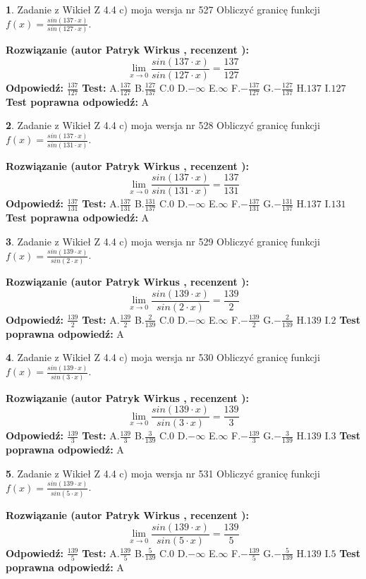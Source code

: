 \documentclass[12pt, a4paper]{article}
\theoremstyle{definition} %
\newtheorem{zad}{}
\newcommand{\zadStart}[1]{\begin{zad}#1\newline}
\newcommand{\zadStop}{\end{zad}}
\newcommand{\rozwStart}[2]{\noindent \textbf{Rozwiązanie (autor #1 , recenzent #2): }\newline}
\newcommand{\rozwStop}{\newline}
\newcommand{\odpStart}{\noindent \textbf{Odpowiedź:}\newline}
\newcommand{\odpStop}{\newline}
\newcommand{\testStart}{\noindent \textbf{Test:}\newline}
\newcommand{\testStop}{\newline}
\newcommand{\kluczStart}{\noindent \textbf{Test poprawna odpowiedź:}\newline}
\newcommand{\kluczStop}{\newline}
\begin{document}
\zadStart{Zadanie z Wikieł Z 4.4 c) moja wersja nr 527}
Obliczyć granicę funkcji $f(x)=\frac{sin(137\cdot x)}{sin(127\cdot x)}$.
\zadStop
\rozwStart{Patryk Wirkus}{}
$$\lim\limits_{x\to 0}\frac{sin(137\cdot x)}{sin(127\cdot x)}=
\frac{137}{127}$$
\rozwStop
\odpStart
$\frac{137}{127}$
\odpStop
\testStart
A.$\frac{137}{127}$
B.$\frac{127}{137}$
C.$0$
D.$-\infty$
E.$\infty$
F.$-\frac{137}{127}$
G.$-\frac{127}{137}$
H.$137$
I.$127$
\testStop
\kluczStart
A
\kluczStop



\zadStart{Zadanie z Wikieł Z 4.4 c) moja wersja nr 528}
Obliczyć granicę funkcji $f(x)=\frac{sin(137\cdot x)}{sin(131\cdot x)}$.
\zadStop
\rozwStart{Patryk Wirkus}{}
$$\lim\limits_{x\to 0}\frac{sin(137\cdot x)}{sin(131\cdot x)}=
\frac{137}{131}$$
\rozwStop
\odpStart
$\frac{137}{131}$
\odpStop
\testStart
A.$\frac{137}{131}$
B.$\frac{131}{137}$
C.$0$
D.$-\infty$
E.$\infty$
F.$-\frac{137}{131}$
G.$-\frac{131}{137}$
H.$137$
I.$131$
\testStop
\kluczStart
A
\kluczStop



\zadStart{Zadanie z Wikieł Z 4.4 c) moja wersja nr 529}
Obliczyć granicę funkcji $f(x)=\frac{sin(139\cdot x)}{sin(2\cdot x)}$.
\zadStop
\rozwStart{Patryk Wirkus}{}
$$\lim\limits_{x\to 0}\frac{sin(139\cdot x)}{sin(2\cdot x)}=
\frac{139}{2}$$
\rozwStop
\odpStart
$\frac{139}{2}$
\odpStop
\testStart
A.$\frac{139}{2}$
B.$\frac{2}{139}$
C.$0$
D.$-\infty$
E.$\infty$
F.$-\frac{139}{2}$
G.$-\frac{2}{139}$
H.$139$
I.$2$
\testStop
\kluczStart
A
\kluczStop



\zadStart{Zadanie z Wikieł Z 4.4 c) moja wersja nr 530}
Obliczyć granicę funkcji $f(x)=\frac{sin(139\cdot x)}{sin(3\cdot x)}$.
\zadStop
\rozwStart{Patryk Wirkus}{}
$$\lim\limits_{x\to 0}\frac{sin(139\cdot x)}{sin(3\cdot x)}=
\frac{139}{3}$$
\rozwStop
\odpStart
$\frac{139}{3}$
\odpStop
\testStart
A.$\frac{139}{3}$
B.$\frac{3}{139}$
C.$0$
D.$-\infty$
E.$\infty$
F.$-\frac{139}{3}$
G.$-\frac{3}{139}$
H.$139$
I.$3$
\testStop
\kluczStart
A
\kluczStop



\zadStart{Zadanie z Wikieł Z 4.4 c) moja wersja nr 531}
Obliczyć granicę funkcji $f(x)=\frac{sin(139\cdot x)}{sin(5\cdot x)}$.
\zadStop
\rozwStart{Patryk Wirkus}{}
$$\lim\limits_{x\to 0}\frac{sin(139\cdot x)}{sin(5\cdot x)}=
\frac{139}{5}$$
\rozwStop
\odpStart
$\frac{139}{5}$
\odpStop
\testStart
A.$\frac{139}{5}$
B.$\frac{5}{139}$
C.$0$
D.$-\infty$
E.$\infty$
F.$-\frac{139}{5}$
G.$-\frac{5}{139}$
H.$139$
I.$5$
\testStop
\kluczStart
A
\kluczStop
\end{document}
